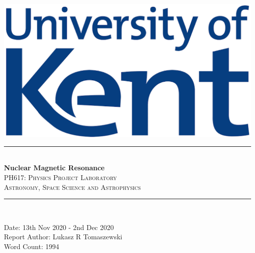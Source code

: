 \documentclass[12pt]{article}
\title{}
\begin{document}
\begin{titlepage}
\newcommand{\HRule}{\rule{\linewidth}{0.5mm}}
\begin{centering} 
\includegraphics[scale=0.7]{Images/Uni_of_Kent.png}\\[1cm]
\HRule \\ [0.3cm]
\Huge{\bfseries{Nuclear Magnetic Resonance}} \\
\textsc{\large PH617: Physics Project Laboratory}\\ [-0.1cm]
\textsc{\large Astronomy, Space Science and Astrophysics}\\ [-0.2cm]
\HRule \\[0.5cm]
\begin{minipage}{0.625\textwidth}
\begin{center} \large
{\large Date: 13th Nov 2020 - 2nd Dec 2020}\\[0.2cm]
{\large Report Author: Lukasz R Tomaszewski}\\[0.2cm]
{\large Word Count: 1994}\\
\end{center}
\end{minipage}\\[2cm]
\vfill
\end{centering} 
\end{titlepage}
\newpage
\begin{titlepage}
\begin{tableofcontents}
\end{tableofcontents}
\end{titlepage}
\newpage
\end{document}
